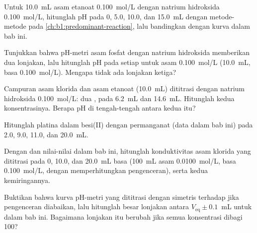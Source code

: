 \begin{exercise}[$\star\star$]\label{exo:b1:titration-methods:5}
Untuk  \qty{10.0}{mL} asam etanoat \qty{0.100}{mol/L} dengan
natrium hidroksida \qty{0.100}{mol/L}, hitunglah pH pada 0, 5.0, 10.0,
dan \qty{15.0}{mL} dengan metode-metode pada
\cref{ch:b1:predominant-reaction}, lalu bandingkan dengan kurva dalam
bab ini.
\end{exercise}

\begin{exercise}[$\star\star$]\label{exo:b1:titration-methods:6}
Tunjukkan bahwa  pH-metri asam fosfat dengan natrium hidroksida
memberikan dua lonjakan, lalu hitunglah pH pada setiap  untuk
asam \qty{0.100}{mol/L} (\qty{10.0}{mL}, basa \qty{0.100}{mol/L}).
Mengapa tidak ada lonjakan ketiga?
\end{exercise}

\begin{exercise}[$\star\star$]\label{exo:b1:titration-methods:7}
Campuran asam klorida dan asam etanoat (\qty{10.0}{mL}) dititrasi dengan
natrium hidroksida \qty{0.100}{mol/L}: dua , pada
\qty{6.2}{mL} dan \qty{14.6}{mL}. Hitunglah kedua konsentrasinya. Berapa
pH di tengah-tengah antara kedua  itu?
\end{exercise}

\begin{exercise}[$\star\star$]\label{exo:b1:titration-methods:8}
Hitunglah  platina dalam  besi(II) dengan
permanganat (data dalam bab ini) pada 2.0, 9.0, 11.0, dan
\qty{20.0}{mL}.
\end{exercise}

\begin{exercise}[$\star\star$]\label{exo:b1:titration-methods:9}
Dengan  dan nilai-nilai dalam bab ini, hitunglah
konduktivitas asam klorida yang dititrasi pada 0, 10.0, dan
\qty{20.0}{mL} basa (\qty{100}{mL} asam \qty{0.0100}{mol/L}, basa
\qty{0.100}{mol/L}, dengan memperhitungkan pengenceran), serta kedua
kemiringannya.
\end{exercise}

\begin{exercise}[$\star\star\star$]\label{exo:b1:titration-methods:10}
Buktikan bahwa kurva pH-metri  yang dititrasi dengan 
simetris terhadap  jika pengenceran diabaikan, lalu
hitunglah besar lonjakan antara $V_{\mathrm{eq}} \pm 0.1$~mL untuk 
dalam bab ini. Bagaimana lonjakan itu berubah jika semua konsentrasi
dibagi 100?
\end{exercise}

